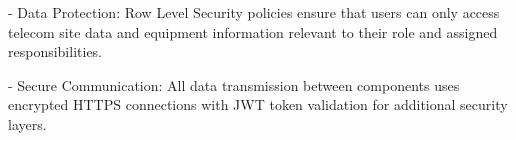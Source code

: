 - Data Protection: 
\vspace{0.2cm}
\newline
Row Level Security policies ensure that users can only access telecom site data and equipment information relevant to their role and assigned responsibilities.
\vspace{0.5cm} 
\newline

- Secure Communication: 
\vspace{0.2cm}
\newline
All data transmission between components uses encrypted HTTPS connections with JWT token validation for additional security layers.